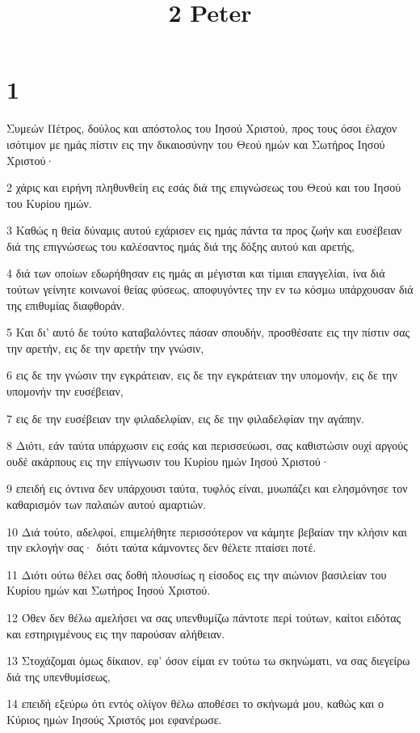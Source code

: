

\title{2 Peter}


\chapter{1}

\par Συμεών Πέτρος, δούλος και απόστολος του Ιησού Χριστού, προς τους όσοι έλαχον ισότιμον με ημάς πίστιν εις την δικαιοσύνην του Θεού ημών και Σωτήρος Ιησού Χριστού·
\par 2 χάρις και ειρήνη πληθυνθείη εις εσάς διά της επιγνώσεως του Θεού και του Ιησού του Κυρίου ημών.
\par 3 Καθώς η θεία δύναμις αυτού εχάρισεν εις ημάς πάντα τα προς ζωήν και ευσέβειαν διά της επιγνώσεως του καλέσαντος ημάς διά της δόξης αυτού και αρετής,
\par 4 διά των οποίων εδωρήθησαν εις ημάς αι μέγισται και τίμιαι επαγγελίαι, ίνα διά τούτων γείνητε κοινωνοί θείας φύσεως, αποφυγόντες την εν τω κόσμω υπάρχουσαν διά της επιθυμίας διαφθοράν.
\par 5 Και δι' αυτό δε τούτο καταβαλόντες πάσαν σπουδήν, προσθέσατε εις την πίστιν σας την αρετήν, εις δε την αρετήν την γνώσιν,
\par 6 εις δε την γνώσιν την εγκράτειαν, εις δε την εγκράτειαν την υπομονήν, εις δε την υπομονήν την ευσέβειαν,
\par 7 εις δε την ευσέβειαν την φιλαδελφίαν, εις δε την φιλαδελφίαν την αγάπην.
\par 8 Διότι, εάν ταύτα υπάρχωσιν εις εσάς και περισσεύωσι, σας καθιστώσιν ουχί αργούς ουδέ ακάρπους εις την επίγνωσιν του Κυρίου ημών Ιησού Χριστού·
\par 9 επειδή εις όντινα δεν υπάρχουσι ταύτα, τυφλός είναι, μυωπάζει και ελησμόνησε τον καθαρισμόν των παλαιών αυτού αμαρτιών.
\par 10 Διά τούτο, αδελφοί, επιμελήθητε περισσότερον να κάμητε βεβαίαν την κλήσιν και την εκλογήν σας· διότι ταύτα κάμνοντες δεν θέλετε πταίσει ποτέ.
\par 11 Διότι ούτω θέλει σας δοθή πλουσίως η είσοδος εις την αιώνιον βασιλείαν του Κυρίου ημών και Σωτήρος Ιησού Χριστού.
\par 12 Όθεν δεν θέλω αμελήσει να σας υπενθυμίζω πάντοτε περί τούτων, καίτοι ειδότας και εστηριγμένους εις την παρούσαν αλήθειαν.
\par 13 Στοχάζομαι όμως δίκαιον, εφ' όσον είμαι εν τούτω τω σκηνώματι, να σας διεγείρω διά της υπενθυμίσεως,
\par 14 επειδή εξεύρω ότι εντός ολίγον θέλω αποθέσει το σκήνωμά μου, καθώς και ο Κύριος ημών Ιησούς Χριστός μοι εφανέρωσε.
